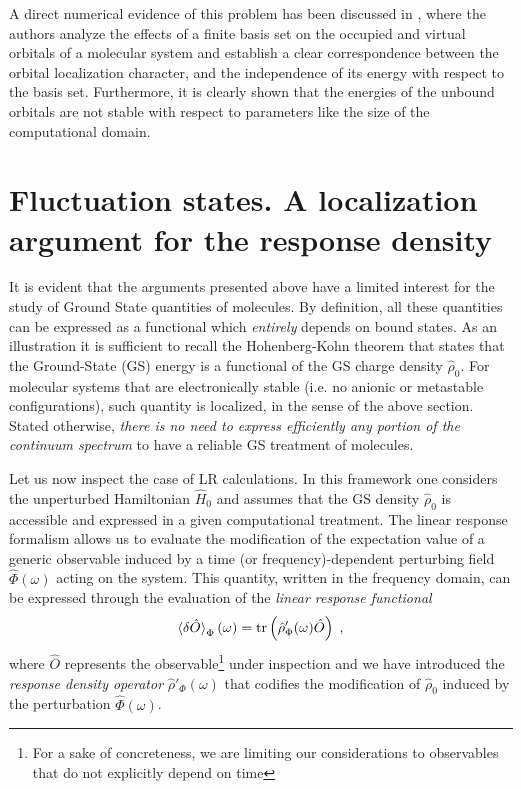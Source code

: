 \documentclass[reprint,aps,prb]{revtex4-1}
\newcommand{\be}{\begin{equation}}
\newcommand{\ee}{\end{equation}}
\newcommand{\lb}{\label}
\newcommand{\op}[1]{\hat {#1}}
\newcommand{\trace}[1]{\mathrm{tr}\left(#1\right)}
\newcommand{\dmnot}{\op{\rho}_0}
\newcommand{\dm}{\op{\rho}}
\newcommand{\hnot}{\op{H}_0}
\begin{document}
A direct numerical evidence of this problem has been discussed in \cite{boffi2016}, where the authors analyze the effects of a finite basis set on the
occupied and virtual orbitals of a molecular system and establish a clear correspondence between the orbital localization character,
and the independence of its energy with respect to the basis set.
Furthermore, it is clearly shown that the energies of the unbound orbitals are not stable with respect to parameters like the size of the computational domain.

\section{Fluctuation states. A localization argument for the response density}
\label{FluctuationState}
It is evident that the arguments presented above have a limited interest for the study
of Ground State quantities of molecules. By definition, all these quantities can be expressed as a
functional which \emph{entirely} depends on bound states. As an illustration it is sufficient to recall
the Hohenberg-Kohn theorem that states that the Ground-State (GS) energy is a functional of the GS
charge density $\dmnot$. For molecular systems that are electronically stable (i.e. no anionic or metastable configurations),
such quantity is localized, in the sense of the above section. Stated otherwise,
\emph{there is no need to express efficiently any portion of the continuum spectrum} to have a reliable GS treatment of molecules.

Let us now inspect the case of LR calculations.
In this framework one considers the unperturbed Hamiltonian $\hnot$ and assumes that
the GS density $\dmnot$ is accessible and expressed in a given computational treatment.
The linear response formalism allows us to evaluate the modification of the expectation value of a generic observable induced by a
time (or frequency)-dependent perturbing field $\op\Phi(\omega)$ acting on the system.
This quantity, written in the frequency domain, can be expressed through the evaluation of the \emph{linear response functional}
\be\lb{LinearResponseFunctDef1}
\braket{\delta\op O}_\Phi(\omega) = \trace{\dm'_\Phi(\omega)\op O} \;,
\ee
where $\op O$ represents the observable\footnote{For a sake of concreteness, we are limiting our considerations to observables that do not explicitly depend on time} under inspection
and we have introduced the \emph{response density operator} $\dm'_\Phi(\omega)$ that codifies the modification of $\dmnot$ induced by the perturbation $\op\Phi(\omega)$.
\end{document}
